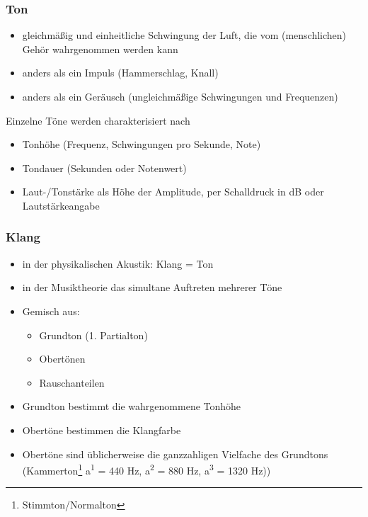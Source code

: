 \documentclass[11pt,ngerman]{beamer}
\begin{document}
\begin{frame}
\frametitle{Ton}

\begin{itemize}
	\item gleichmäßig und einheitliche Schwingung der Luft, die vom (menschlichen) Gehör wahrgenommen werden kann
	\item anders als ein Impuls (Hammerschlag, Knall)
	\item anders als ein Geräusch (ungleichmäßige Schwingungen und Frequenzen)
\end{itemize}\vspace*{1em}

Einzelne Töne werden charakterisiert nach \vspace*{0.5em}

\begin{itemize}
	\item Tonhöhe (Frequenz, Schwingungen pro Sekunde, Note)
	\item Tondauer (Sekunden oder Notenwert)
	\item Laut-/Tonstärke als Höhe der Amplitude, per Schalldruck in dB oder Lautstärkeangabe
\end{itemize}

\end{frame}


\begin{frame}
\frametitle{Klang}

\begin{itemize}
\item in der physikalischen Akustik: Klang = Ton
\item in der Musiktheorie das simultane Auftreten mehrerer Töne
\item Gemisch aus:

\begin{itemize}
	\item Grundton (1. Partialton)
	\item Obertönen
	\item Rauschanteilen
	\end{itemize}

\item Grundton bestimmt die wahrgenommene Tonhöhe
\item Obertöne bestimmen die Klangfarbe
\item Obertöne sind üblicherweise die ganzzahligen Vielfache des Grundtons (Kammerton\footnote{Stimmton/Normalton} a\textsuperscript{1} = 440 Hz, a\textsuperscript{2} = 880 Hz, a\textsuperscript{3} = 1320 Hz))
\end{itemize}
\end{frame}
\end{document}
